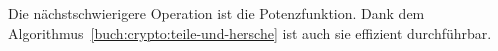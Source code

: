 Die nächstschwierigere Operation ist die Potenzfunktion.
Dank dem Algorithmus~\ref{buch:crypto:teile-und-hersche} ist auch
sie effizient durchführbar.

%
%


